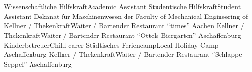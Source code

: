 \section{\sidejobs}
    {\ifgerman Wissenschaftliche Hilfskraft\else Academic Assistant\fi}
    {\newline{} \fhac}
    {}{}{}
    {\ifgerman Studentische Hilfskraft\else Student Assistant\fi}
    {\newline{}\ifgerman Dekanat für Maschinenwesen der \else Faculty of Mechanical Engineering of \fi \rwthac}
    {}{}{}
    {\ifgerman Kellner / Thekenkraft\else Waiter / Bartender\fi}
    {\newline{}Restaurant \enquote{times}}
    {Aachen}{}{}
    {\ifgerman Kellner / Thekenkraft\else Waiter / Bartender\fi}
    {\newline{}Restaurant \enquote{Ottels Biergarten}}
    {Aschaffenburg}{}{}
    {\ifgerman Kinderbetreuer\else Child carer\fi}
    {\newline{}\ifgerman Städtisches Feriencamp\else Local Holiday Camp\fi}
    {Aschaffenburg}{}{}
    {\ifgerman Kellner / Thekenkraft\else Waiter / Bartender\fi}
    {\newline{}Restaurant \enquote{Schlappe Seppel}}
    {Aschaffenburg}{}{}